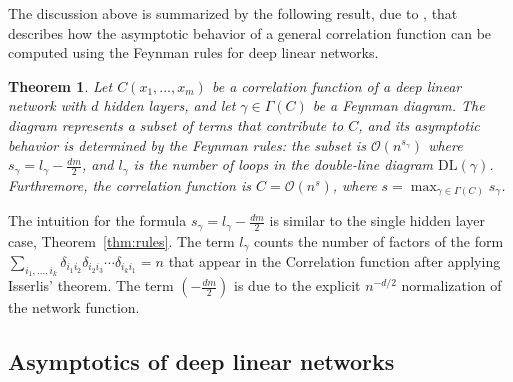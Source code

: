 \documentclass[english]{article}
\newtheorem{thm}{Theorem}
\newcommand{\cO}{\ensuremath{\mathcal{O}}}
\newcommand{\DL}{\mathrm{DL}}
\begin{document}
The discussion above is summarized by the following result, due to \cite{tHooft:1973alw}, that describes how the asymptotic behavior of a general correlation function can be computed using the Feynman rules for deep linear networks.
\begin{thm}\label{thm:feynDL}
  Let $C(x_1,\dots,x_m)$ be a correlation function of a deep linear network with $d$ hidden layers, and let $\gamma \in \Gamma(C)$ be a Feynman diagram.
  The diagram represents a subset of terms that contribute to $C$, and its asymptotic behavior is determined by the Feynman rules: the subset is $\cO(n^{s_\gamma})$ where $s_\gamma = l_\gamma - \frac{dm}{2}$, and $l_\gamma$ is the number of loops in the double-line diagram $\DL(\gamma)$.
 Furthremore, the correlation function is $C = \cO(n^s)$, where $s = \max_{\gamma\in\Gamma(C)} s_\gamma$.
\end{thm}
The intuition for the formula $s_\gamma = l_\gamma - \frac{dm}{2}$ is similar to the single hidden layer case, Theorem~\ref{thm:rules}.
The term $l_\gamma$ counts the number of factors of the form $\sum_{i_1,\dots,i_k} \delta_{i_1 i_2} \delta_{i_2 i_3} \cdots \delta_{i_k i_1} = n$ that appear in the Correlation function after applying Isserlis' theorem.
The term $\left( -\frac{dm}{2} \right)$ is due to the explicit $n^{-d/2}$ normalization of the network function.

\subsection{Asymptotics of deep linear networks}\label{app:adln}
\end{document}
